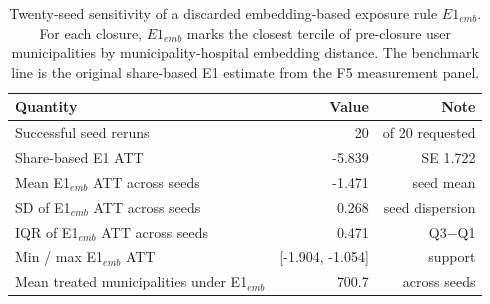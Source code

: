 \begin{table}[h!]
\centering
\caption{Twenty-seed sensitivity of a discarded embedding-based exposure rule $E1_{emb}$. For each closure, $E1_{emb}$ marks the closest tercile of pre-closure user municipalities by municipality-hospital embedding distance. The benchmark line is the original share-based E1 estimate from the F5 measurement panel.}
\label{tab:seed-att-distribution}
\small
\begin{tabular}{lrr}
\toprule
Quantity & Value & Note \\
\midrule
Successful seed reruns & 20 & of 20 requested \\
Share-based E1 ATT & -5.839 & SE 1.722 \\
Mean E1$_{emb}$ ATT across seeds & -1.471 & seed mean \\
SD of E1$_{emb}$ ATT across seeds & 0.268 & seed dispersion \\
IQR of E1$_{emb}$ ATT across seeds & 0.471 & Q3$-$Q1 \\
Min / max E1$_{emb}$ ATT & [-1.904, -1.054] & support \\
Mean treated municipalities under E1$_{emb}$ & 700.7 & across seeds \\
\bottomrule
\end{tabular}
\end{table}
